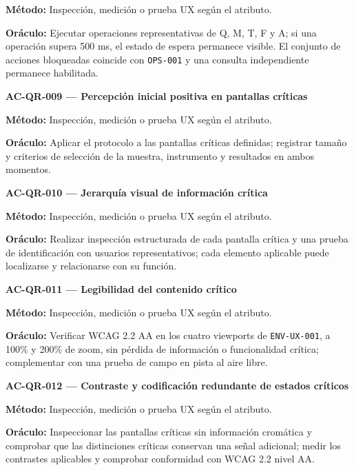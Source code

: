 \documentclass[10pt,letterpaper]{article}
\begin{document}
\textbf{Método:} Inspección, medición o prueba UX según el atributo.\par
\textbf{Oráculo:} Ejecutar operaciones representativas de Q, M, T, F y A; si una operación supera 500 ms, el estado de espera permanece visible. El conjunto de acciones bloqueadas coincide con \texttt{OPS-001} y una consulta independiente permanece habilitada.\par\vspace{0.45em}
\noindent\textbf{AC-QR-009 --- Percepción inicial positiva en pantallas críticas}\par
\textbf{Método:} Inspección, medición o prueba UX según el atributo.\par
\textbf{Oráculo:} Aplicar el protocolo a las pantallas críticas definidas; registrar tamaño y criterios de selección de la muestra, instrumento y resultados en ambos momentos.\par\vspace{0.45em}
\noindent\textbf{AC-QR-010 --- Jerarquía visual de información crítica}\par
\textbf{Método:} Inspección, medición o prueba UX según el atributo.\par
\textbf{Oráculo:} Realizar inspección estructurada de cada pantalla crítica y una prueba de identificación con usuarios representativos; cada elemento aplicable puede localizarse y relacionarse con su función.\par\vspace{0.45em}
\noindent\textbf{AC-QR-011 --- Legibilidad del contenido crítico}\par
\textbf{Método:} Inspección, medición o prueba UX según el atributo.\par
\textbf{Oráculo:} Verificar WCAG 2.2 AA en los cuatro viewports de \texttt{ENV-UX-001}, a 100\% y 200\% de zoom, sin pérdida de información o funcionalidad crítica; complementar con una prueba de campo en pista al aire libre.\par\vspace{0.45em}
\noindent\textbf{AC-QR-012 --- Contraste y codificación redundante de estados críticos}\par
\textbf{Método:} Inspección, medición o prueba UX según el atributo.\par
\textbf{Oráculo:} Inspeccionar las pantallas críticas sin información cromática y comprobar que las distinciones críticas conservan una señal adicional; medir los contrastes aplicables y comprobar conformidad con WCAG 2.2 nivel AA.\par\vspace{0.45em}
\end{document}

